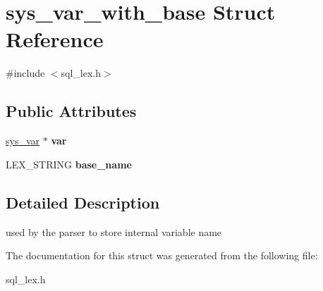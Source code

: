 \hypertarget{structsys__var__with__base}{}\section{sys\+\_\+var\+\_\+with\+\_\+base Struct Reference}
\label{structsys__var__with__base}


{\ttfamily \#include $<$sql\+\_\+lex.\+h$>$}

\subsection*{Public Attributes}
\begin{DoxyCompactItemize}
\item 
\mbox{\label{structsys__var__with__base_aa8c33e74e3a65a92d1f6d5d57916d41c}} 
\mbox{\hyperlink{classsys__var}{sys\+\_\+var}} $\ast$ {\bfseries var}
\item 
\mbox{\label{structsys__var__with__base_a70f96d3b148b276db767ad1fb3271c0d}} 
L\+E\+X\+\_\+\+S\+T\+R\+I\+NG {\bfseries base\+\_\+name}
\end{DoxyCompactItemize}


\subsection{Detailed Description}
used by the parser to store internal variable name 

The documentation for this struct was generated from the following file\+:\begin{DoxyCompactItemize}
\item 
sql\+\_\+lex.\+h\end{DoxyCompactItemize}
